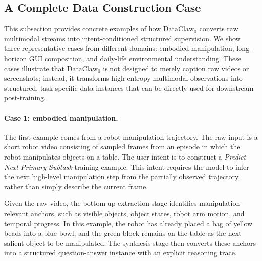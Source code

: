 \subsection{A Complete Data Construction Case}
\label{app:complete_case}

This subsection provides concrete examples of how $\text{DataClaw}_0$ converts raw multimodal streams into intent-conditioned structured supervision. We show three representative cases from different domains: embodied manipulation, long-horizon GUI composition, and daily-life environmental understanding. These cases illustrate that $\text{DataClaw}_0$ is not designed to merely caption raw videos or screenshots; instead, it transforms high-entropy multimodal observations into structured, task-specific data instances that can be directly used for downstream post-training.

\paragraph{Case 1: embodied manipulation.}
The first example comes from a robot manipulation trajectory. The raw input is a short robot video consisting of sampled frames from an episode in which the robot manipulates objects on a table. The user intent is to construct a \emph{Predict Next Primary Subtask} training example. This intent requires the model to infer the next high-level manipulation step from the partially observed trajectory, rather than simply describe the current frame.

Given the raw video, the bottom-up extraction stage identifies manipulation-relevant anchors, such as visible objects, object states, robot arm motion, and temporal progress. In this example, the robot has already placed a bag of yellow beads into a blue bowl, and the green block remains on the table as the next salient object to be manipulated. The synthesis stage then converts these anchors into a structured question-answer instance with an explicit reasoning trace.

